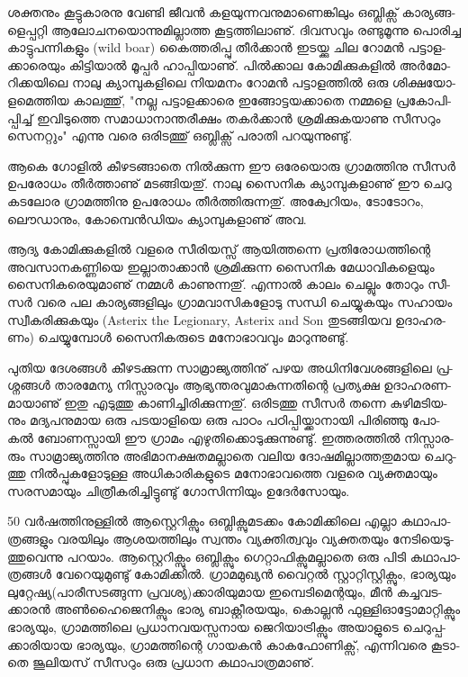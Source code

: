 
­ശ­ക്ത­നും കൂ­ട്ടു­കാ­ര­നു വേ­ണ്ടി ജീ­വന്‍ കള­യു­ന്ന­വ­നു­മാ­ണെ­ങ്കി­ലും ഒ­ബ്ലി­ക്സ് കാ­ര്യ­ങ്ങ­ളെ­പ്പ­റ്റി ആലോ­ച­ന­യൊ­ന്നു­മി­ല്ലാ­ത്ത 
കൂ­ട്ട­ത്തി­ലാ­ണു്. ദി­വ­സ­വും രണ്ടു­മൂ­ന്നു പൊ­രി­ച്ച കാ­ട്ടു­പ­ന്നി­ക­ളും (wild boar) കൈ­ത്ത­രി­പ്പു തീര്‍­ക്കാന്‍ ഇട­യ്ക്കു ചില റോ­മന്‍ 
പട്ടാ­ള­ക്കാ­രെ­യും കി­ട്ടി­യാല്‍ മൂ­പ്പര്‍ ഹാ­പ്പി­യാ­ണു്. പില്‍­ക്കാല കോ­മി­ക്കു­ക­ളില്‍ അര്‍­മോ­റി­ക്ക­യി­ലെ നാ­ലു ക്യാ­മ്പു­ക­ളി­ലെ 
നി­യ­മ­നം റോ­മന്‍ പട്ടാ­ള­ത്തില്‍ ഒരു ശി­ക്ഷ­യോ­ള­മെ­ത്തിയ കാ­ല­ത്തു്, "ന­ല്ല പട്ടാ­ള­ക്കാ­രെ ഇങ്ങോ­ട്ട­യ­ക്കാ­തെ നമ്മ­ളെ 
പ്ര­കോ­പി­പ്പി­ച്ച് ഇവി­ടു­ത്തെ സമാ­ധാ­നാ­ന്ത­രീ­ക്ഷം തകര്‍­ക്കാന്‍ ശ്ര­മി­ക്കു­ക­യാ­ണു സീ­സ­റും സെ­ന­റ്റും" എന്നു വരെ ഒരി­ട­ത്തു് 
ഒബ്ലി­ക്സ് പരാ­തി പറ­യു­ന്നു­ണ്ടു്.

ആ­കെ ഗോ­ളില്‍ കീ­ഴ­ട­ങ്ങാ­തെ നില്‍­ക്കു­ന്ന ഈ ഒരേ­യൊ­രു ഗ്രാ­മ­ത്തി­നു ­സീ­സര്‍ ഉപ­രോ­ധം തീര്‍­ത്താ­ണു് മട­ങ്ങി­യ­തു്. 
നാ­ലു സൈ­നിക ക്യാ­മ്പു­ക­ളാ­ണു് ഈ ചെ­റു കട­ലോര ഗ്രാ­മ­ത്തി­നു ഉപ­രോ­ധം തീര്‍­ത്തി­രു­ന്ന­തു്. അക്വേ­റി­യം, ടോ­ടോ­റം, 
ലൌ­ഡാ­നും, കോ­മ്പെന്‍­ഡി­യം ക്യാ­മ്പു­ക­ളാ­ണു് അവ.

ആ­ദ്യ കോ­മി­ക്കു­ക­ളില്‍ വള­രെ സീ­രി­യ­സ്സ് ആയി­ത്ത­ന്നെ പ്ര­തി­രോ­ധ­ത്തി­ന്റെ അവ­സാ­ന­ക­ണ്ണി­യെ ഇല്ലാ­താ­ക്കാന്‍ 
ശ്ര­മി­ക്കു­ന്ന സൈ­നിക മേ­ധാ­വി­ക­ളെ­യും സൈ­നി­ക­രെ­യു­മാ­ണു് നമ്മള്‍ കാ­ണു­ന്ന­തു്. എന്നാല്‍ കാ­ലം ചെ­ല്ലും തോ­റും 
സീ­സര്‍ വരെ പല കാ­ര്യ­ങ്ങ­ളി­ലും ഗ്രാ­മ­വാ­സി­ക­ളോ­ടു സന്ധി ചെ­യ്യു­ക­യും സഹാ­യം സ്വീ­ക­രി­ക്കു­ക­യും (Asterix the
Legionary, Asterix and Son തു­ട­ങ്ങി­യവ ഉദാ­ഹ­ര­ണം) ചെ­യ്യു­മ്പോള്‍ സൈ­നി­ക­രു­ടെ മനോ­ഭാ­വ­വും മാ­റു­ന്നു­ണ്ടു്.

­പു­തിയ ദേ­ശ­ങ്ങള്‍ കീ­ഴ­ട­ക്കു­ന്ന സാ­മ്രാ­ജ്യ­ത്തി­നു് പഴയ അധി­നി­വേ­ശ­ങ്ങ­ളി­ലെ പ്ര­ശ്ന­ങ്ങള്‍ താ­ര­മേ­ന്യ നി­സ്സാ­ര­വും 
ആഭ്യ­ന്ത­ര­വു­മാ­കു­ന്ന­തി­ന്റെ പ്ര­ത്യ­ക്ഷ ഉദാ­ഹ­ര­ണ­മാ­യാ­ണു് ഇതു എടു­ത്തു കാ­ണി­ച്ചി­രി­ക്കു­ന്ന­തു്. ഒരി­ട­ത്തു സീ­സര്‍ തന്നെ 
കു­ഴി­മ­ടി­യ­നും മദ്യ­പ­നു­മായ ഒരു പട­യാ­ളി­യെ ഒരു പാ­ഠം പഠി­പ്പി­യ്ക്കാ­നാ­യി പി­രി­ഞ്ഞു പോ­കല്‍ ബോ­ണ­സ്സാ­യി ഈ ഗ്രാ­മം 
എഴു­തി­ക്കൊ­ടു­ക്കു­ന്നു­ണ്ടു്. ഇത്ത­ര­ത്തില്‍ നി­സ്സാ­ര­രും സാ­മ്രാ­ജ്യ­ത്തി­നു അഭി­മാ­ന­ക്ഷ­ത­മ­ല്ലാ­തെ വലിയ ദോ­ഷ­മി­ല്ലാ­ത്ത­തു­മായ 
ചെ­റു­ത്തു നില്‍­പ്പു­ക­ളോ­ടു­ള്ള അധി­കാ­രി­ക­ളു­ടെ മനോ­ഭാ­വ­ത്തെ വള­രെ വ്യ­ക്ത­മാ­യും സര­സ­മാ­യും ചി­ത്രീ­ക­രി­ച്ചി­ട്ടു­ണ്ടു് 
ഗോ­സി­ന്നി­യും ഉദേര്‍­സോ­യും­.

50 വര്‍­ഷ­ത്തി­നു­ള്ളില്‍ ആസ്റ്റെ­റി­ക്സും ഒബ്ലി­ക്സു­മ­ട­ക്കം കോ­മി­ക്കി­ലെ എല്ലാ കഥാ­പാ­ത്ര­ങ്ങ­ളും വര­യി­ലും ആശ­യ­ത്തി­ലും സ്വ­ന്തം 
വ്യ­ക്തി­ത്വ­വും വ്യ­ക്ത­ത­യും നേ­ടി­യെ­ടു­ത്തു­വെ­ന്നു പറ­യാം. ആസ്റ്റെ­റി­ക്സും ഒബ്ലി­ക്സും ഗെ­റ്റാ­ഫി­ക്സു­മ­ല്ലാ­തെ ഒരു പി­ടി കഥാ­പാ­ത്ര­ങ്ങള്‍ 
വേ­റെ­യു­മു­ണ്ടു് കോ­മി­ക്കില്‍. ഗ്രാ­മ­മു­ഖ്യന്‍ വൈ­റ്റല്‍ സ്റ്റാ­റ്റി­സ്റ്റി­ക്സും, ഭാ­ര്യ­യും ലു­റ്റേ­ഷ്യ(­പാ­രീ­സ­ട­ങ്ങു­ന്ന പ്ര­വ­ശ്യ)­ക്കാ­രി­യു­മായ 
ഇമ്പെ­ടി­മെ­ന്റ­യും, മീന്‍ കച്ച­വ­ട­ക്കാ­രന്‍ അണ്‍­ഹൈ­ജെ­നി­ക്സും ഭാ­ര്യ ബാ­ക്റ്റീ­ര­യ­യും, കൊ­ല്ലന്‍ ഫു­ള്ളി­ഓ­ട്ടോ­മാ­റ്റി­ക്സും ഭാ­ര്യ­യും, 
ഗ്രാ­മ­ത്തി­ലെ പ്ര­ധാ­ന­വ­യ­സ്സ­നായ ജെ­റി­യാ­ട്രി­ക്സും അയാ­ളു­ടെ ചെ­റു­പ്പ­ക്കാ­രി­യായ ഭാ­ര്യ­യും, ഗ്രാ­മ­ത്തി­ന്റെ ഗാ­യ­കന്‍ 
കാ­ക­ഫോ­ണി­ക്സ്, എന്നി­വ­രെ കൂ­ടാ­തെ ജൂ­ലി­യ­സ് സീ­സ­റും ഒരു പ്ര­ധാന കഥാ­പാ­ത്ര­മാ­ണു്.


